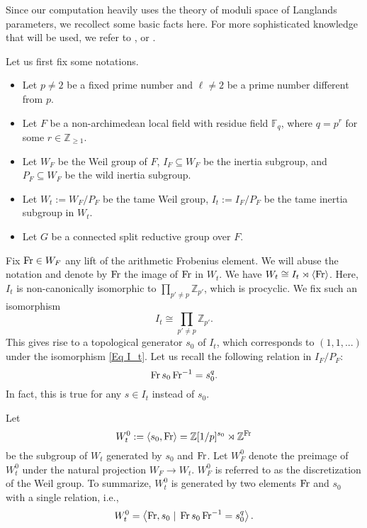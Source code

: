 	Since our computation heavily uses the theory of moduli space of Langlands parameters, we recollect some basic facts here. For more sophisticated knowledge that will be used, we refer to \cite[Section 3, 4]{dat2022ihes}, or \cite[Section 2, 4]{dhkm2020moduli}. 
	
	Let us first fix some notations.
	\begin{itemize}
		\item Let $p \neq 2$ be a fixed prime number and $\ell \neq 2$ be a prime number different from $p$. 
		\item Let $F$ be a non-archimedean local field with residue field $\mathbb{F}_q$, where $q=p^r$ for some $r \in \mathbb{Z}_{\geq 1}$.
		\item Let $W_F$ be the Weil group of $F$, $I_F \subseteq W_F$ be the inertia subgroup, and $P_F \subseteq W_F$ be the wild inertia subgroup.
		\item Let $W_t:=W_F/P_F$ be the tame Weil group, $I_t:=I_F/P_F$ be the tame inertia subgroup in $W_t$.
		\item Let $G$ be a connected split reductive group over $F$.
	\end{itemize}
	     Fix $\operatorname{Fr} \in W_F$ any lift of the arithmetic Frobenius element. We will abuse the notation and denote by $\operatorname{Fr}$ the image of $\operatorname{Fr}$ in $W_t$. We have $W_t \cong I_t \rtimes \left<\operatorname{Fr}\right>$. Here, $I_t$ is non-canonically isomorphic to $\prod_{p'\neq p}\mathbb{Z}_{p'}$, which is procyclic. We fix such an isomorphism
	     \begin{equation}\label{Eq I_t}
	     	I_t \cong \prod_{p'\neq p}\mathbb{Z}_{p'}.
	     \end{equation}
    This gives rise to a topological generator $s_0$ of $I_t$, which corresponds to $(1, 1, ...)$ under the isomorphism \eqref{Eq I_t}. Let us recall the following relation in $I_F/P_F$:
	\begin{equation}\label{Eq Fr s_0}
		\operatorname{Fr} s_0 \operatorname{Fr}^{-1}=s_0^q.
	\end{equation}
	In fact, this is true for any $s \in I_t$ instead of $s_0$.
	
	Let 
	$$W_t^0:=\left<s_0, \operatorname{Fr}\right>=\mathbb{Z}[1/p]^{s_0} \rtimes \mathbb{Z}^{\operatorname{Fr}}$$ 
	be the subgroup of $W_t$ generated by $s_0$ and $\operatorname{Fr}$. Let $W_F^0$ denote the preimage of $W_t^0$ under the natural projection $W_F \to W_t$. $W_F^0$ is referred to as the discretization of the Weil group. To summarize, $W_t^0$ is generated by two elements $\operatorname{Fr}$ and $s_0$ with a single relation, i.e., 
	\begin{equation}\label{Equation presentation of the tame Weil group}
		W_t^0=\left<\operatorname{Fr}, s_0\;|\;\operatorname{Fr} s_0 \operatorname{Fr}^{-1}=s_0^q\right>.
	\end{equation} 
	
